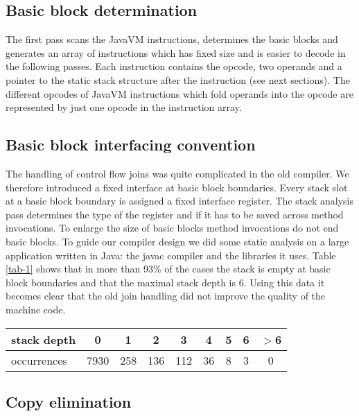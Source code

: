 \subsection{Basic block determination}

The first pass scans the JavaVM instructions, determines the basic blocks
and generates an array of instructions which has fixed size and is easier
to decode in the following passes. Each instruction contains the opcode,
two operands and a pointer to the static stack structure after the
instruction (see next sections). The different opcodes of JavaVM
instructions which fold operands into the opcode are represented by just
one opcode in the instruction array.


\subsection{Basic block interfacing convention}

The handling of control flow joins was quite complicated in the old
compiler. We therefore introduced a fixed interface at basic block
boundaries. Every stack slot at a basic block boundary is assigned a fixed
interface register. The stack analysis pass determines the type of the
register and if it has to be saved across method invocations. To enlarge
the size of basic blocks method invocations do not end basic blocks. To
guide our compiler design we did some static analysis on a large
application written in Java: the javac compiler and the libraries it uses.
Table \ref{tab-1} shows that in more than 93\% of the cases the stack is
empty at basic block boundaries and that the maximal stack depth is 6.
Using this data it becomes clear that the old join handling did not improve
the quality of the machine code.

\begin{table*}
\begin{center}
\begin{tabular}[b]{|l|c|c|c|c|c|c|c|c|}
\hline 
stack depth &   0  &  1  &  2  &  3  &  4  &  5  &  6 & $>$6 \\ \hline           
occurrences & 7930 & 258 & 136 & 112 &  36 &  8  &  3 &  0   \\ \hline           
\end{tabular}
\caption{distribution of stack depth at block boundary}
\label{tab-1}
\end{center}
\end{table*}


\subsection{Copy elimination}

